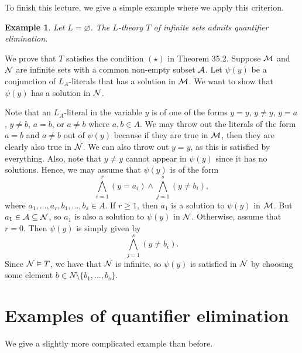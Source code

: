 \documentclass[10pt]{article}
\makeatletter
\theoremstyle{newstyle}
\newtheorem{exmp}[thm]{Example}
\newenvironment{pf}[1][\proofname]{\par
  \pushQED{\qed}%
  \normalfont \topsep0\p@\relax
  \trivlist
  \item[\hskip\labelsep\scshape
  #1\@addpunct{.}]\ignorespaces
}{%
  \popQED\endtrivlist\@endpefalse
}
\makeatother
\begin{document}
To finish this lecture, we give a simple example where we apply this criterion.

\begin{exmp}
Let $L = \varnothing$. The $L$-theory $T$ of infinite sets admits quantifier elimination.
\end{exmp}
\begin{pf}
We prove that $T$ satisfies the condition $(\star)$ in Theorem 35.2. 
Suppose ${\cal M}$ and ${\cal N}$ are infinite sets with a common non-empty subset ${\cal A}$. 
Let $\psi(y)$ be a conjunction of $L_A$-literals that has a solution in ${\cal M}$. We want to 
show that $\psi(y)$ has a solution in ${\cal N}$. 

Note that an $L_A$-literal in the variable $y$ is of one of the forms 
$y = y$, $y \neq y$, $y = a$, $y \neq b$, $a = b$, or $a \neq b$ where $a, b \in A$. 
We may throw out the literals of the form $a = b$ and $a \neq b$ out of $\psi(y)$ 
because if they are true in ${\cal M}$, then they are clearly also true in ${\cal N}$. 
We can also throw out $y = y$, as this is satisfied by everything. 
Also, note that $y \neq y$ cannot appear in $\psi(y)$ since it has no solutions. 
Hence, we may assume that $\psi(y)$ is of the form 
\[ \bigwedge_{i=1}^r (y = a_i) \wedge \bigwedge_{j=1}^s (y \neq b_i), \]
where $a_1, \dots, a_r, b_1, \dots, b_s \in A$. If $r \geq 1$, then $a_1$ is a solution to 
$\psi(y)$ in ${\cal M}$. But $a_1 \in {\cal A} \subseteq {\cal N}$, so $a_1$ is also a solution to 
$\psi(y)$ in ${\cal N}$. Otherwise, assume that $r = 0$. Then $\psi(y)$ is simply given by 
\[ \bigwedge_{j=1}^s (y \neq b_i). \] 
Since ${\cal N} \vDash T$, we have that ${\cal N}$ is infinite, so $\psi(y)$ is satisfied in 
${\cal N}$ by choosing some element $b \in N \setminus \{b_1, \dots, b_s\}$. 
\end{pf}

\newpage 
\section{Examples of quantifier elimination}

We give a slightly more complicated example than before.
\end{document}
